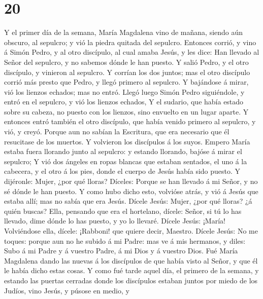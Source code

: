 \hypertarget{section-19}{%
\section{20}\label{section-19}}

 Y el primer día de la semana, María Magdalena vino de
mañana, siendo aún obscuro, al sepulcro; y vió la piedra quitada del
sepulcro.  Entonces corrió, y vino á Simón Pedro, y al otro
discípulo, al cual amaba Jesús, y les dice: Han llevado al Señor del
sepulcro, y no sabemos dónde le han puesto.  Y salió Pedro,
y el otro discípulo, y vinieron al sepulcro.  Y corrían los
dos juntos; mas el otro discípulo corrió más presto que Pedro, y llegó
primero al sepulcro.  Y bajándose á mirar, vió los lienzos
echados; mas no entró.  Llegó luego Simón Pedro siguiéndole,
y entró en el sepulcro, y vió los lienzos echados,  Y el
sudario, que había estado sobre su cabeza, no puesto con los lienzos,
sino envuelto en un lugar aparte.  Y entonces entró también
el otro discípulo, que había venido primero al sepulcro, y vió, y creyó.
 Porque aun no sabían la Escritura, que era necesario que él
resucitase de los muertos.  Y volvieron los discípulos á
los suyos.  Empero María estaba fuera llorando junto al
sepulcro: y estando llorando, bajóse á mirar el sepulcro; 
Y vió dos ángeles en ropas blancas que estaban sentados, el uno á la
cabecera, y el otro á los pies, donde el cuerpo de Jesús había sido
puesto.  Y dijéronle: Mujer, ¿por qué lloras? Díceles:
Porque se han llevado á mi Señor, y no sé dónde le han puesto.
 Y como hubo dicho esto, volvióse atrás, y vió á Jesús que
estaba allí; mas no sabía que era Jesús.  Dícele Jesús:
Mujer, ¿por qué lloras? ¿á quién buscas? Ella, pensando que era el
hortelano, dícele: Señor, si tú lo has llevado, dime dónde lo has
puesto, y yo lo llevaré.  Dícele Jesús: ¡María! Volviéndose
ella, dícele: ¡Rabboni! que quiere decir, Maestro.  Dícele
Jesús: No me toques: porque aun no he subido á mi Padre: mas ve á mis
hermanos, y diles: Subo á mi Padre y á vuestro Padre, á mi Dios y á
vuestro Dios.  Fué María Magdalena dando las nuevas á los
discípulos de que había visto al Señor, y que él le había dicho estas
cosas.  Y como fué tarde aquel día, el primero de la
semana, y estando las puertas cerradas donde los discípulos estaban
juntos por miedo de los Judíos, vino Jesús, y púsose en medio, y
